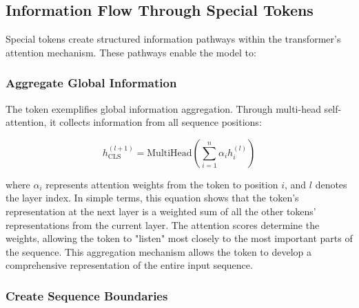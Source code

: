 \subsection{Information Flow Through Special Tokens}

Special tokens create structured information pathways within the transformer's attention mechanism. These pathways enable the model to:

\subsubsection{Aggregate Global Information}

The \cls{} token exemplifies global information aggregation. Through multi-head self-attention, it collects information from all sequence positions:

\begin{equation}
h_{\text{CLS}}^{(l+1)} = \text{MultiHead}\left(\sum_{i=1}^{n} \alpha_{i} h_i^{(l)}\right)
\end{equation}

where $\alpha_i$ represents attention weights from the \cls{} token to position $i$, and $l$ denotes the layer index. In simple terms, this equation shows that the \cls{} token's representation at the next layer is a weighted sum of all the other tokens' representations from the current layer. The attention scores determine the weights, allowing the \cls{} token to "listen" most closely to the most important parts of the sequence. This aggregation mechanism allows the \cls{} token to develop a comprehensive representation of the entire input sequence.
\begin{comment}
Feedback: The equation is correct, but it might be helpful to add a plain-language explanation of what it means. For example: "In simple terms, this equation shows that the [CLS] token's representation at the next layer is a weighted sum of all the other tokens' representations from the current layer. The attention scores determine the weights, allowing the [CLS] token to 'listen' most closely to the most important parts of the sequence."

STATUS: addressed - added plain-language explanation of the attention equation showing weighted aggregation
\end{comment}

\subsubsection{Create Sequence Boundaries}

